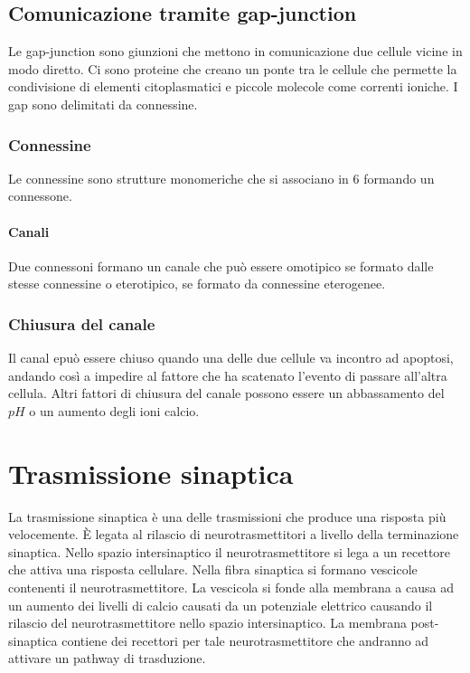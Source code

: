 	\subsection{Comunicazione tramite gap-junction}
	Le gap-junction sono giunzioni che mettono in comunicazione due cellule vicine in modo diretto.
	Ci sono proteine che creano un ponte tra le cellule che permette la condivisione di elementi citoplasmatici e piccole molecole come correnti ioniche.
	I gap sono delimitati da connessine.

		\subsubsection{Connessine}
		Le connessine sono strutture monomeriche che si associano in $6$ formando un connessone.

			\paragraph{Canali}
			Due connessoni formano un canale che pu\`o essere omotipico se formato dalle stesse connessine o eterotipico, se formato da connessine eterogenee.

		\subsubsection{Chiusura del canale}
		Il canal epu\`o essere chiuso quando una delle due cellule va incontro ad apoptosi, andando cos\`i a impedire al fattore che ha scatenato l'evento di passare all'altra cellula.
		Altri fattori di chiusura del canale possono essere un abbassamento del $pH$ o un aumento degli ioni calcio.

\section{Trasmissione sinaptica}
La trasmissione sinaptica \`e una delle trasmissioni che produce una risposta pi\`u velocemente.
\`E legata al rilascio di neurotrasmettitori a livello della terminazione sinaptica.
Nello spazio intersinaptico il neurotrasmettitore si lega a un recettore che attiva una risposta cellulare.
Nella fibra sinaptica si formano vescicole contenenti il neurotrasmettitore.
La vescicola si fonde alla membrana a causa ad un aumento dei livelli di calcio causati da un potenziale elettrico causando il rilascio del neurotrasmettitore nello spazio intersinaptico.
La membrana post-sinaptica contiene dei recettori per tale neurotrasmettitore che andranno ad attivare un pathway di trasduzione.

